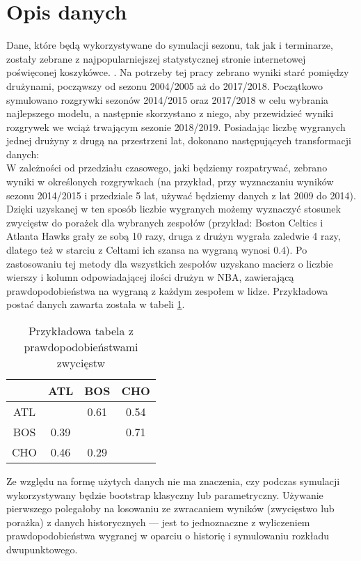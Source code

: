 \documentclass[inzynierska]{pwr_wmat_praca_dyplomowa}
\theoremstyle{plain}
\numberwithin{theorem}{chapter}
\theoremstyle{definition}
\numberwithin{theorem}{chapter}
\begin{document}
\section{Opis danych}
Dane, które będą wykorzystywane do symulacji sezonu, tak jak i terminarze, zostały zebrane z najpopularniejszej statystycznej stronie internetowej poświęconej koszykówce. \cite{dane}.
Na potrzeby tej pracy zebrano wyniki starć pomiędzy drużynami, począwszy od sezonu 2004/2005 aż do 2017/2018. Początkowo symulowano rozgrywki sezonów 2014/2015 oraz 2017/2018 w celu wybrania najlepszego modelu, a następnie skorzystano z niego, aby przewidzieć wyniki rozgrywek we wciąż trwającym sezonie 2018/2019.
Posiadając liczbę wygranych jednej drużyny z drugą na przestrzeni lat, dokonano następujących transformacji danych:
\\
\hspace*{6mm}W zależności od przedziału czasowego, jaki będziemy rozpatrywać, zebrano wyniki w określonych rozgrywkach (na przykład, przy wyznaczaniu wyników sezonu 2014/2015 i przedziale 5 lat, używać będziemy danych z lat 2009 do 2014). Dzięki uzyskanej w ten sposób liczbie wygranych możemy wyznaczyć stosunek zwycięstw do porażek dla wybranych zespołów (przykład: Boston Celtics i Atlanta Hawks grały ze sobą 10 razy, druga z drużyn wygrała zaledwie 4 razy, dlatego też w starciu z Celtami ich szansa na wygraną wynosi $0.4$). Po zastosowaniu tej metody dla wszystkich zespołów uzyskano macierz o liczbie wierszy i kolumn odpowiadającej ilości drużyn w NBA, zawierającą prawdopodobieństwa na wygraną z każdym zespołem w lidze. Przykładowa postać danych zawarta została w tabeli \ref{dane_tabela}.
\begin{table}[]
	\centering
	\begin{tabular}{|c|c|c|c|}
		\hline
		&ATL & BOS & CHO\\ \hline
		ATL &  & 0.61&0.54\\ \hline
		BOS & 0.39 & &0.71\\ \hline
		CHO & 0.46 & 0.29&\\ \hline
	\end{tabular}
	\caption{Przykładowa tabela z prawdopodobieństwami zwycięstw}\label{dane_tabela}	
\end{table}

Ze względu na formę użytych danych nie ma znaczenia, czy podczas symulacji wykorzystywany będzie bootstrap klasyczny lub parametryczny. Używanie pierwszego polegałoby na losowaniu ze zwracaniem wyników (zwycięstwo lub porażka) z danych historycznych --- jest to jednoznaczne z wyliczeniem prawdopodobieństwa wygranej w oparciu o historię i symulowaniu rozkładu dwupunktowego.
\end{document}

